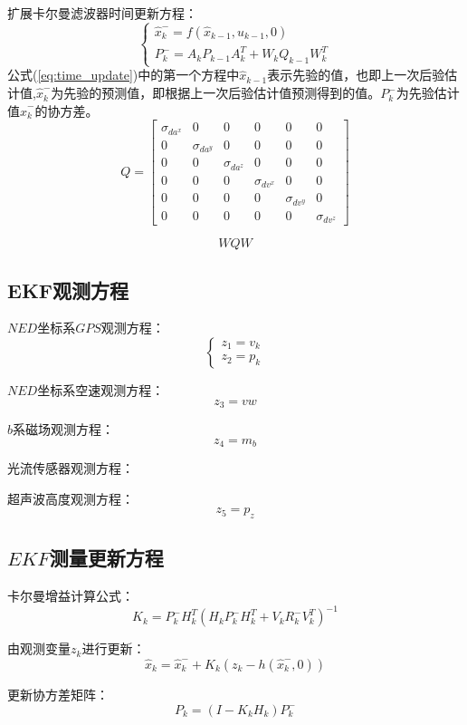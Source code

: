 \documentclass{article}
\begin{document}
扩展卡尔曼滤波器时间更新方程：
\begin{equation}
\left\{
\begin{array}{l}
	\hat{x}_k^- = f(\hat{x}_{k-1}, u_{k-1}, 0) \\
	P_k^- = A_kP_{k-1}A_k^T +W_k Q_{k-1}W_k^T
\end{array}
\right.
\label{eq:time_update}
\end{equation}
公式(\ref{eq:time_update})中的第一个方程中$\hat{x}_{k-1}$表示先验的值，也即上一次后验估计值,$\hat{x}_k^-$为先验的预测值，即根据上一次后验估计值预测得到的值。$P_k^-$为先验估计值$\hat{x}_k^-$的协方差。
\begin{equation}
	Q = 
	\left[
	\begin{array}{cccccc}
	\sigma_{da^x} & 0 & 0 & 0 & 0 & 0 \\
	0 & \sigma_{da^y} & 0 & 0 & 0 & 0 \\
	0 & 0 & \sigma_{da^z} & 0 & 0 & 0 \\
	0 & 0 & 0 & \sigma_{dv^x} & 0 & 0 \\
	0 & 0 & 0 & 0 & \sigma_{dv^y} & 0 \\
	0 & 0 & 0 & 0 & 0 & \sigma_{dv^z} 
	\end{array}
	\right]
\end{equation}

\begin{equation}
	WQW
\end{equation}

\subsection{EKF观测方程}
$NED$坐标系$GPS$观测方程：
\begin{equation}
\left\{
\begin{array}{l}
z_1 = v_k \\
z_2 = p_k
\end{array}
\right.
\end{equation}

$NED$坐标系空速观测方程：
\begin{equation}
z_3 = vw
\end{equation}

$b$系磁场观测方程：
\begin{equation}
	z_4 = m_b
\end{equation}

光流传感器观测方程：


超声波高度观测方程：
\begin{equation}
	z_5 = p_z
\end{equation}

\subsection{$EKF$测量更新方程}
卡尔曼增益计算公式：
\begin{equation}
	K_k = P_k^- H_k^T (H_k P_k^- H_k^T + V_k R_k^- V_k^T)^{-1}
\end{equation}

由观测变量$z_k$进行更新：
\begin{equation}
	\hat{x}_k = \hat{x}_k^- + K_k(z_k - h(\hat{x}_k^-,0))
\end{equation}

更新协方差矩阵：
\begin{equation}
	P_k=(I-K_k H_k)P_k^-
\end{equation}
\end{document}
